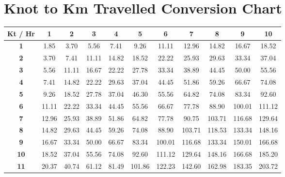 \section{Knot to Km Travelled Conversion Chart}
\begin{table}[h]
\centering
\label{knotToKm}
\begin{tabular}{c|cccccccccc}
\textbf{Kt / Hr} & \textbf{1} & \textbf{2} & \textbf{3} & \textbf{4} & \textbf{5} & \textbf{6} & \textbf{7} & \textbf{8} & \textbf{9} & \textbf{10} \\
\hline %
\textbf{1}       & 1.85       & 3.70       & 5.56       & 7.41       & 9.26       & 11.11      & 12.96      & 14.82      & 16.67      & 18.52       \\
\textbf{2}       & 3.70       & 7.41       & 11.11      & 14.82      & 18.52      & 22.22      & 25.93      & 29.63      & 33.34      & 37.04       \\
\textbf{3}       & 5.56       & 11.11      & 16.67      & 22.22      & 27.78      & 33.34      & 38.89      & 44.45      & 50.00      & 55.56       \\
\textbf{4}       & 7.41       & 14.82      & 22.22      & 29.63      & 37.04      & 44.45      & 51.86      & 59.26      & 66.67      & 74.08       \\
\textbf{5}       & 9.26       & 18.52      & 27.78      & 37.04      & 46.30      & 55.56      & 64.82      & 74.08      & 83.34      & 92.60       \\
\textbf{6}       & 11.11      & 22.22      & 33.34      & 44.45      & 55.56      & 66.67      & 77.78      & 88.90      & 100.01     & 111.12      \\
\textbf{7}       & 12.96      & 25.93      & 38.89      & 51.86      & 64.82      & 77.78      & 90.75      & 103.71     & 116.68     & 129.64      \\
\textbf{8}       & 14.82      & 29.63      & 44.45      & 59.26      & 74.08      & 88.90      & 103.71     & 118.53     & 133.34     & 148.16      \\
\textbf{9}       & 16.67      & 33.34      & 50.00      & 66.67      & 83.34      & 100.01     & 116.68     & 133.34     & 150.01     & 166.68      \\
\textbf{10}      & 18.52      & 37.04      & 55.56      & 74.08      & 92.60      & 111.12     & 129.64     & 148.16     & 166.68     & 185.20      \\
\textbf{11}      & 20.37      & 40.74      & 61.12      & 81.49      & 101.86     & 122.23     & 142.60     & 162.98     & 183.35     & 203.72      \\

\end{tabular}
\end{table}
